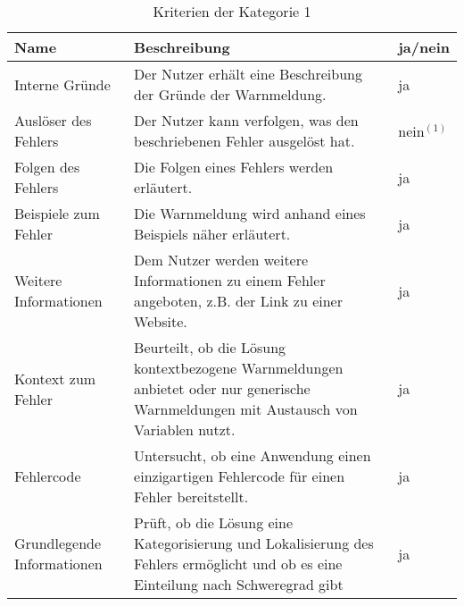 \begin{table}[htp]
    \centering
    \begin{tabularx}{\columnwidth}{XXl}
        \toprule
        \textbf{Name}              & \textbf{Beschreibung}                                                                                                                & \textbf{ja/nein} \\
        \midrule
        Interne Gründe             & Der Nutzer erhält eine Beschreibung der Gründe der Warnmeldung.                                                                      & ja               \\
        \midrule
        Auslöser des Fehlers       & Der Nutzer kann verfolgen, was den beschriebenen Fehler ausgelöst hat.                                                               & nein$^{(1)}$     \\
        \midrule
        Folgen des Fehlers         & Die Folgen eines Fehlers werden erläutert.                                                                                           & ja               \\
        \midrule
        Beispiele zum Fehler       & Die Warnmeldung wird anhand eines Beispiels näher erläutert.                                                                         & ja               \\
        \midrule
        Weitere Informationen      & Dem Nutzer werden weitere Informationen zu einem Fehler angeboten, z.B. der Link zu einer Website.                                   & ja               \\
        \midrule
        Kontext zum Fehler         & Beurteilt, ob die Lösung kontextbezogene Warnmeldungen anbietet oder nur generische Warnmeldungen mit Austausch von Variablen nutzt. & ja               \\
        \midrule
        Fehlercode                 & Untersucht, ob eine Anwendung einen einzigartigen Fehlercode für einen Fehler bereitstellt.                                          & ja               \\
        \midrule
        Grundlegende Informationen & Prüft, ob die Lösung eine Kategorisierung und Lokalisierung des Fehlers ermöglicht und ob es eine Einteilung nach Schweregrad gibt   & ja               \\
        \bottomrule
    \end{tabularx}
    \caption{Kriterien der Kategorie 1}
    \label{tbl:criteria-category-1}
\end{table}

